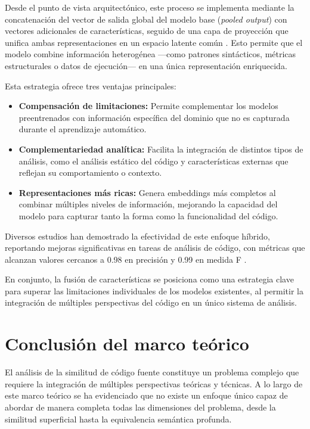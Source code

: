 Desde el punto de vista arquitectónico, este proceso se implementa mediante la concatenación del vector de salida global del modelo base (\textit{pooled output}) con vectores adicionales de características, seguido de una capa de proyección que unifica ambas representaciones en un espacio latente común \cite{MartinezGil2026Improving}. Esto permite que el modelo combine información heterogénea —como patrones sintácticos, métricas estructurales o datos de ejecución— en una única representación enriquecida.

Esta estrategia ofrece tres ventajas principales:

\begin{itemize}
\item \textbf{Compensación de limitaciones:} Permite complementar los modelos preentrenados con información específica del dominio que no es capturada durante el aprendizaje automático.

\item \textbf{Complementariedad analítica:} Facilita la integración de distintos tipos de análisis, como el análisis estático del código y características externas que reflejan su comportamiento o contexto.

\item \textbf{Representaciones más ricas:} Genera embeddings más completos al combinar múltiples niveles de información, mejorando la capacidad del modelo para capturar tanto la forma como la funcionalidad del código.
\end{itemize}

Diversos estudios han demostrado la efectividad de este enfoque híbrido, reportando mejoras significativas en tareas de análisis de código, con métricas que alcanzan valores cercanos a 0.98 en precisión y 0.99 en medida F \cite{MartinezGil2026Improving}. 

En conjunto, la fusión de características se posiciona como una estrategia clave para superar las limitaciones individuales de los modelos existentes, al permitir la integración de múltiples perspectivas del código en un único sistema de análisis.

\section{Conclusión del marco teórico}

El análisis de la similitud de código fuente constituye un problema complejo que requiere la integración de múltiples perspectivas teóricas y técnicas. A lo largo de este marco teórico se ha evidenciado que no existe un enfoque único capaz de abordar de manera completa todas las dimensiones del problema, desde la similitud superficial hasta la equivalencia semántica profunda.

